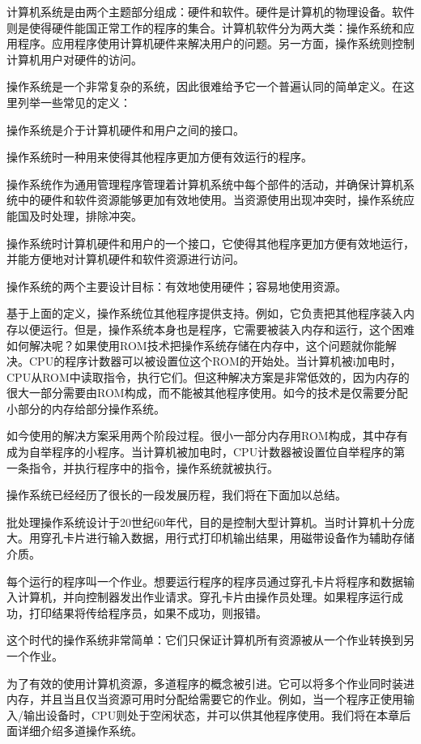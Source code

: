 计算机系统是由两个主题部分组成：硬件和软件。硬件是计算机的物理设备。软件则是使得硬件能国正常工作的程序的集合。计算机软件分为两大类：操作系统和应用程序。应用程序使用计算机硬件来解决用户的问题。另一方面，操作系统则控制计算机用户对硬件的访问。

操作系统是一个非常复杂的系统，因此很难给予它一个普遍认同的简单定义。在这里列举一些常见的定义：

操作系统是介于计算机硬件和用户之间的接口。

操作系统时一种用来使得其他程序更加方便有效运行的程序。

操作系统作为通用管理程序管理着计算机系统中每个部件的活动，并确保计算机系统中的硬件和软件资源能够更加有效地使用。当资源使用出现冲突时，操作系统应能国及时处理，排除冲突。

操作系统时计算机硬件和用户的一个接口，它使得其他程序更加方便有效地运行，并能方便地对计算机硬件和软件资源进行访问。

操作系统的两个主要设计目标：有效地使用硬件；容易地使用资源。

基于上面的定义，操作系统位其他程序提供支持。例如，它负责把其他程序装入内存以便运行。但是，操作系统本身也是程序，它需要被装入内存和运行，这个困难如何解决呢？如果使用ROM技术把操作系统存储在内存中，这个问题就你能解决。CPU的程序计数器可以被设置位这个ROM的开始处。当计算机被i加电时，CPU从ROM中读取指令，执行它们。但这种解决方案是非常低效的，因为内存的很大一部分需要由ROM构成，而不能被其他程序使用。如今的技术是仅需要分配小部分的内存给部分操作系统。

如今使用的解决方案采用两个阶段过程。很小一部分内存用ROM构成，其中存有成为自举程序的小程序。当计算机被加电时，CPU计数器被设置位自举程序的第一条指令，并执行程序中的指令，操作系统就被执行。

操作系统已经经历了很长的一段发展历程，我们将在下面加以总结。

批处理操作系统设计于20世纪60年代，目的是控制大型计算机。当时计算机十分庞大。用穿孔卡片进行输入数据，用行式打印机输出结果，用磁带设备作为辅助存储介质。

每个运行的程序叫一个作业。想要运行程序的程序员通过穿孔卡片将程序和数据输入计算机，并向控制器发出作业请求。穿孔卡片由操作员处理。如果程序运行成功，打印结果将传给程序员，如果不成功，则报错。

这个时代的操作系统非常简单：它们只保证计算机所有资源被从一个作业转换到另一个作业。

为了有效的使用计算机资源，多道程序的概念被引进。它可以将多个作业同时装进内存，并且当且仅当资源可用时分配给需要它的作业。例如，当一个程序正使用输入/输出设备时，CPU则处于空闲状态，并可以供其他程序使用。我们将在本章后面详细介绍多道操作系统。

